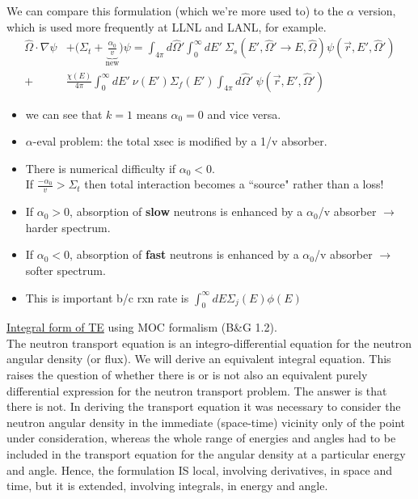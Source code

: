 \documentclass[12pt]{article}
\newcommand{\vOmega}{\ensuremath{\hat{\Omega}}}
\begin{document}
We can compare this formulation (which we're more used to) to the $\alpha$ version, which is used more frequently at LLNL and LANL, for example.
%
\begin{align*}
\vOmega \cdot \nabla \psi &+ \bigl(\Sigma_t + \underbrace{\frac{\alpha_0}{v}}_{\text{new}}\bigr)\psi = \int_{4 \pi} d\vOmega' \int_0^{\infty} dE' \: \Sigma_s(E', \vOmega' \rightarrow E, \vOmega) \psi(\vec{r}, E', \vOmega')\\
 +& \frac{\chi(E)}{4 \pi}\int_0^{\infty} dE' \: \nu(E') \Sigma_f(E') \int_{4 \pi} d\vOmega' \:\psi(\vec{r}, E', \vOmega')
\end{align*}
%
\begin{itemize}
\item we can see that $k=1$ means $\alpha_0 = 0$ and vice versa.
\item $\alpha$-eval problem: the total xsec is modified by a 1/v absorber.
\item There is numerical difficulty if $\alpha_0 < 0$.\\
If $\frac{-\alpha_0}{v} > \Sigma_t$ then total interaction becomes a ``source" rather than a loss!
\item If $\alpha_0 > 0$, absorption of \textbf{slow} neutrons is enhanced by a $\alpha_0$/v absorber $\rightarrow$ harder spectrum.
\item If $\alpha_0 < 0$, absorption of \textbf{fast} neutrons is enhanced by a $\alpha_0$/v absorber $\rightarrow$ softer spectrum.
\item This is important b/c rxn rate is $\int_0^{\infty} dE \Sigma_j(E) \phi(E)$
\end{itemize}


\vspace*{1 em}
\underline{Integral form of TE} using MOC formalism (B\&G 1.2).\\
The neutron transport equation is an integro-differential equation for the
neutron angular density (or flux). We will derive an equivalent integral equation. This raises the question of whether there is or is not also an
equivalent purely differential expression for the neutron transport problem.
The answer is that there is not. In deriving the transport
equation it was necessary to consider the neutron angular density in the 
immediate (space-time) vicinity only of the point under consideration, whereas the
whole range of energies and angles had to be included in the transport equation
for the angular density at a particular energy and angle. Hence, the formulation
IS local, involving derivatives, in space and time, but it is extended, involving
integrals, in energy and angle.
\end{document}
